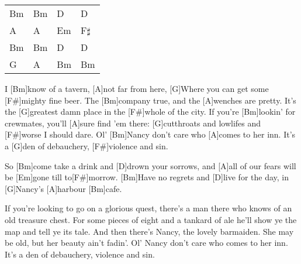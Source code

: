 

\begin{spacing}{0.98}
\begin{guitar}
	{\footnotesize\begin{tabular}{|l|l|l|l|}
			Bm & Bm & D & D \\
			A & A & Em & F$\sharp$ \\
			Bm & Bm & D & D \\
			G & A & Bm & Bm
	\end{tabular}} 
	
	I [Bm]know of a tavern, [A]not far from here,
	[G]Where you can get some [F#]mighty fine beer.
	The [Bm]company true, and the [A]wenches are pretty.
	It's the [G]greatest damn place in the [F#]whole of the city.
	If you're [Bm]lookin' for crewmates, you'll [A]sure find 'em there:
	[G]cutthroats and lowlifes and [F#]worse I should dare.
	Ol' [Bm]Nancy don't care who [A]comes to her inn.
	It's a [G]den of debauchery, [F#]violence and sin.
	
	\begin{highlightbar}
		 
		So [Bm]come take a drink and [D]drown your sorrows,
		and [A]all of our fears will be [Em]gone till to[F#]morrow.
		[Bm]Have no regrets and [D]live for the day,
		in [G]Nancy's [A]harbour [Bm]cafe.
	\end{highlightbar}
	
	\songsection{Verse 2}
	If you're looking to go on a glorious quest,
	there's a man there who knows of an old treasure chest.
	For some pieces of eight and a tankard of ale
	he'll show ye the map and tell ye its tale.
	And then there's Nancy, the lovely barmaiden.
	She may be old, but her beauty ain't fadin'.
	Ol' Nancy don't care who comes to her inn.
	It's a den of debauchery, violence and sin.
	
	\begin{highlightbar}
		  \optionalChord{(x2)}
	\end{highlightbar}
	
	\songsection{Instrumental}
	
	\begin{highlightbar}
		  
	\end{highlightbar}\end{guitar}\end{spacing}